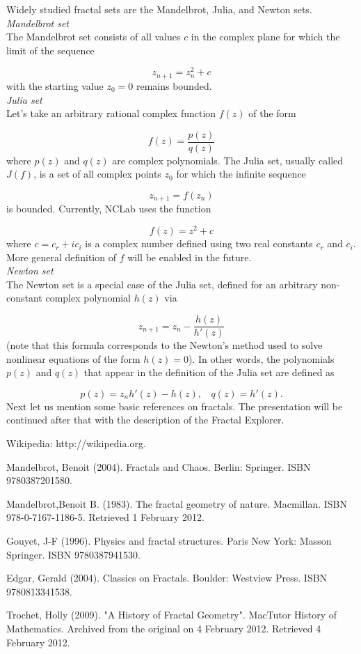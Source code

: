 \documentclass{article}
\begin{document}
Widely studied fractal sets are the Mandelbrot, Julia, and Newton sets. \\

\noindent
{\em Mandelbrot set}\\
The Mandelbrot set consists of all values 
$c$ in the complex plane for which the limit of the sequence 

$$
z_{n+1} = z_n^2 + c
$$
with the starting value $z_0 = 0$ remains bounded.\\

\noindent
{\em Julia set}\\
Let's take an arbitrary rational complex function $f(z)$ of the form  

$$
f(z) = \frac{p(z)}{q(z)}
$$
where $p(z)$ and $q(z)$ are complex polynomials.
The Julia set, usually called $J(f)$, is a set of all complex points $z_0$ 
for which the infinite sequence 

$$
z_{n+1} = f(z_n)
$$
is bounded. Currently, NCLab uses the function 

$$
f(z) = z^2 + c
$$
where $c = c_r + i c_i$ is a complex number defined using two real constants 
$c_r$ and $c_i$. More general definition of $f$ will be enabled in the future.\\

\noindent
{\em Newton set}\\
The Newton set is a special case of the Julia set, defined for an 
arbitrary non-constant complex polynomial $h(z)$ via

$$
z_{n+1} = z_n - \frac{h(z)}{h'(z)}
$$
(note that this formula corresponds to the Newton's method used
to solve nonlinear equations of the form $h(z) = 0$). In other words, the 
polynomials $p(z)$ and $q(z)$ that appear in the definition of the Julia
set are defined as

$$
p(z) = z_n h'(z) - h(z), \ \ \ \ q(z) = h'(z). 
$$
Next let us mention some basic references on fractals. The 
presentation will be continued after that with the description 
of the Fractal Explorer.



\begin{thebibliography}{00}

Wikipedia: http://wikipedia.org.

Mandelbrot, Benoit (2004). Fractals and Chaos. Berlin: Springer. ISBN 9780387201580. 

Mandelbrot,Benoit B. (1983). The fractal geometry of nature. Macmillan. ISBN 978-0-7167-1186-5. Retrieved 1 February 2012.

Gouyet, J-F (1996). Physics and fractal structures. Paris New York: Masson Springer. ISBN 9780387941530.

Edgar, Gerald (2004). Classics on Fractals. Boulder: Westview Press. ISBN 9780813341538.

Trochet, Holly (2009). "A History of Fractal Geometry". MacTutor History of Mathematics. Archived from the original on 4 February 2012. Retrieved 4 February 2012.

 \end{thebibliography}
\end{document}
